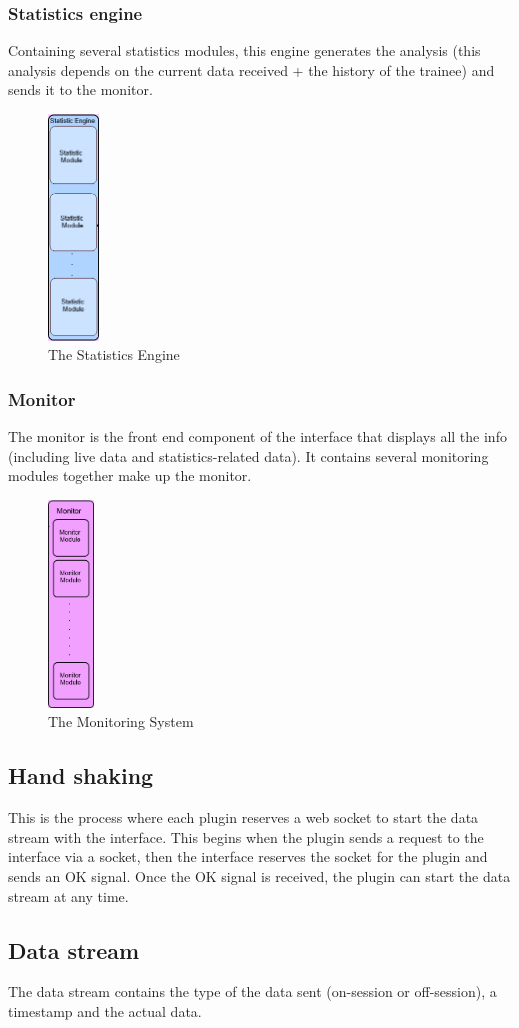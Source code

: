 \documentclass[a4paper]{article}
\begin{document}
\subsubsection{Statistics engine}
Containing several statistics modules, this engine generates the analysis (this analysis depends on the current data received + the history of the trainee) and sends it to the monitor.

\begin{figure}[h!]
\centering
\includegraphics[height=60mm]{Statistics.png}
\caption{The Statistics Engine}
\label{threadsVsSync}
\end{figure}

\subsubsection{Monitor}
The monitor is the front end component of the interface that displays all the info (including live data and statistics-related data). It contains several monitoring modules together make up the monitor.

\begin{figure}[h!]
\centering
\includegraphics[height=55mm]{Monitor.png}
\caption{The Monitoring System}
\label{threadsVsSync}
\end{figure}

\subsection{Hand shaking}
This is the process where each plugin reserves a web socket to start the data stream with the interface. This begins when the plugin sends a request to the interface via a socket, then the interface reserves the socket for the plugin and sends an OK signal. Once the OK signal is received, the plugin can start the data stream at any time.

\subsection{Data stream}
The data stream contains the type of the data sent (on-session or off-session), a timestamp and the actual data.
\end{document}
